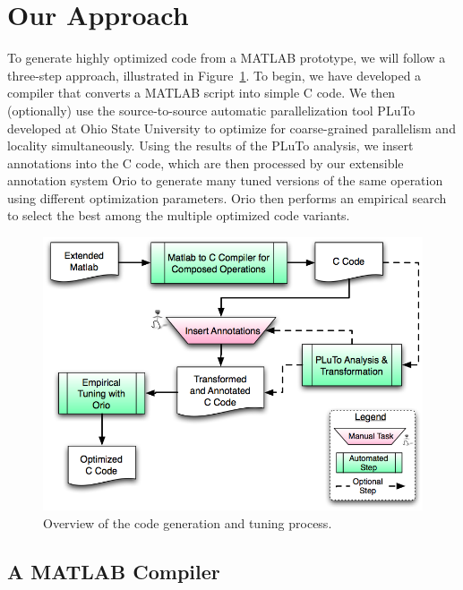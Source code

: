 \documentclass[11pt]{article}
\begin{document}



\section{Our Approach}
\label{sec:approach}

To generate highly optimized code from a MATLAB prototype, we will follow a three-step approach, illustrated in Figure~\ref{fig:process}.  To begin, we have developed a compiler that converts a MATLAB script into simple C code.  We then (optionally) use the source-to-source automatic parallelization tool PLuTo\cite{Pluto} developed at Ohio State University to optimize for coarse-grained parallelism and locality simultaneously. Using the results of the PLuTo analysis, we insert annotations into the C code, which are then processed by our extensible annotation system Orio to generate many tuned versions of the same operation using different optimization parameters. Orio then performs an empirical search to select the best among the multiple optimized code variants.


\begin{figure}[htbp]
\centering
\includegraphics[width=.7\textwidth]{figures/process.png}

\caption{Overview of the code generation and tuning process.}
\label{fig:process}
\end{figure}

\subsection{A MATLAB Compiler}
\label{sec:matlab}
\end{document}
